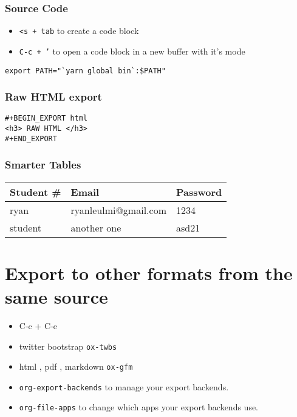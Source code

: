 \documentclass[11pt]{article}
\begin{document}
\subsubsection*{Source Code}
\label{sec:org8433b50}
\begin{itemize}
\item \texttt{<s + tab} to create a code block
\item \texttt{C-c + '} to open a code block in a new buffer with it's mode
\end{itemize}
\begin{verbatim}
export PATH="`yarn global bin`:$PATH"
\end{verbatim}
\subsubsection*{Raw HTML export}
\label{sec:org69594fa}
\begin{verbatim}
#+BEGIN_EXPORT html
<h3> RAW HTML </h3>
#+END_EXPORT
\end{verbatim}
\subsubsection*{Smarter Tables}
\label{sec:org9ccc183}
\begin{center}
\begin{tabular}{lll}
Student \# & Email & Password\\
\hline
ryan & ryanleulmi@gmail.com & 1234\\
student & another one & asd21\\
\end{tabular}
\end{center}
\section*{Export to other formats from the same source}
\label{sec:org500ad24}
\begin{itemize}
\item C-c + C-e
\item twitter bootstrap \texttt{ox-twbs}
\item html , pdf , markdown \texttt{ox-gfm}
\item \texttt{org-export-backends} to manage your export backends.
\item \texttt{org-file-apps} to change which apps your export backends use.
\end{itemize}
\end{document}
